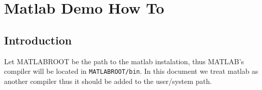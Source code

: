 \section{Matlab Demo How To}
\subsection{Introduction}
Let MATLABROOT be the path to the matlab instalation, thus MATLAB's compiler will be located in \texttt{MATLABROOT/bin}.
In this document we treat matlab as another compiler thus it should be added to the user/system path.


